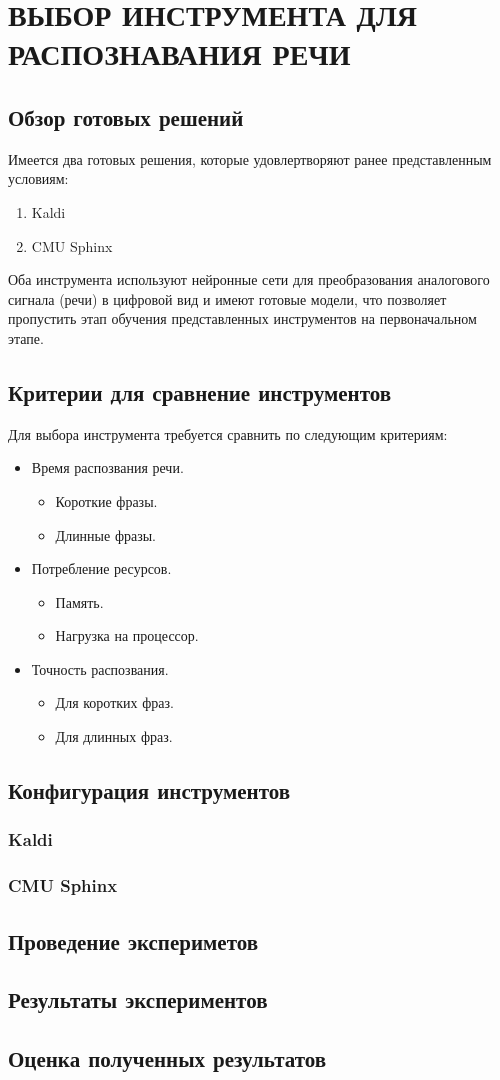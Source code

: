 \chapter{ВЫБОР ИНСТРУМЕНТА ДЛЯ РАСПОЗНАВАНИЯ РЕЧИ}

\section{Обзор готовых решений}

Имеется два готовых решения, которые удовлертворяют ранее представленным условиям:
\begin{enumerate}
    \item Kaldi
    \item CMU Sphinx
\end{enumerate}

Оба инструмента используют нейронные сети для преобразования аналогового сигнала
(речи) в цифровой вид и имеют готовые модели, что позволяет пропустить этап обучения
представленных инструментов на первоначальном этапе.

\section{Критерии для сравнение инструментов}
Для выбора инструмента требуется сравнить по следующим критериям:
\begin{itemize}
    \item Время распозвания речи.
    \begin{itemize}
        \item Короткие фразы.
        \item Длинные фразы.
    \end{itemize}
    \item Потребление ресурсов.
    \begin{itemize}
        \item Память.
        \item Нагрузка на процессор.
    \end{itemize}
    \item Точность распозвания.
    \begin{itemize}
        \item Для коротких фраз.
        \item Для длинных фраз.
    \end{itemize}
\end{itemize}
\section{Конфигурация инструментов}
\subsection{Kaldi}
\subsection{CMU Sphinx}
\section{Проведение экспериметов}
\section{Результаты экспериментов}
\section{Оценка полученных результатов}
